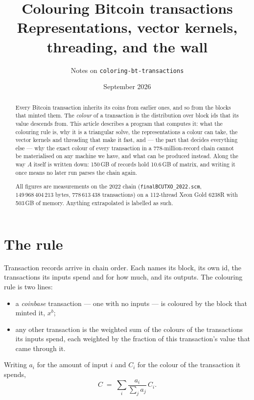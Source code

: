 \documentclass[11pt,a4paper]{article}
\title{Colouring Bitcoin transactions\\
       \large Representations, vector kernels, threading, and the wall}
\author{Notes on \texttt{coloring-bt-transactions}}
\date{September 2026}
\begin{document}
\maketitle

\begin{abstract}
Every Bitcoin transaction inherits its coins from earlier ones, and so from the
blocks that minted them. The \emph{colour} of a transaction is the distribution
over block ids that its value descends from. This article describes a program
that computes it: what the colouring rule is, why it is a triangular solve, the
representations a colour can take, the vector kernels and threading that make it
fast, and --- the part that decides everything else --- why the exact colour of
every transaction in a 778-million-record chain cannot be materialised on any
machine we have, and what can be produced instead. Along the way $A$ itself is
written down: 150\,GB of records hold 10.6\,GB of matrix, and writing it once
means no later run parses the chain again.

All figures are measurements on the 2022 chain
(\texttt{finalBCUTXO\_2022.scm}, $149\,968\,404\,213$ bytes, $778\,613\,438$
transactions) on a 112-thread Xeon Gold 6238R with 503\,GB of memory. Anything
extrapolated is labelled as such.
\end{abstract}

\tableofcontents

\section{The rule}
\label{sec:rule}

Transaction records arrive in chain order. Each names its block, its own id, the
transactions its inputs spend and for how much, and its outputs. The colouring
rule is two lines:

\begin{itemize}
  \item a \emph{coinbase} transaction --- one with no inputs --- is coloured by
        the block that minted it, $x^{b}$;
  \item any other transaction is the weighted sum of the colours of the
        transactions its inputs spend, each weighted by the fraction of this
        transaction's value that came through it.
\end{itemize}

Writing $a_i$ for the amount of input $i$ and $C_i$ for the colour of the
transaction it spends,
\begin{equation}
  C \;=\; \sum_i \frac{a_i}{\sum_j a_j}\, C_i .
  \label{eq:rule}
\end{equation}
\end{document}

